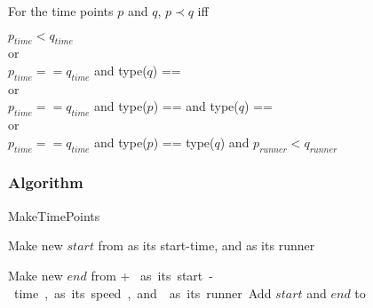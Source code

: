 For the time points $p$ and $q$, $p \prec q$ iff \\

\begin{center}
$p_{time} < q_{time}$\\
or \\
$p_{time} == q_{time}$ and type($q$) == \comFin\\
or \\
$p_{time} == q_{time}$ and type($p$) == \comStart and type($q$) == \comEnd \\
or \\
$p_{time} == q_{time}$ and type($p$) == type($q$) and $p_{runner} < q_{runner}$
\end{center}

\subsubsection{Algorithm}
\begin{algorithm}[H]
\caption{MakeTimePoints}
\highlights
{}
 
Make new \startT $start$ from \start as its start-time, and \run as its runner
  
Make new \eT $end$ from \start + \unit * \n as its start-time, \unit as its speed, and \run as its runner
    
Add $start$ and $end$ to \li

\return \li
\end{algorithm}

